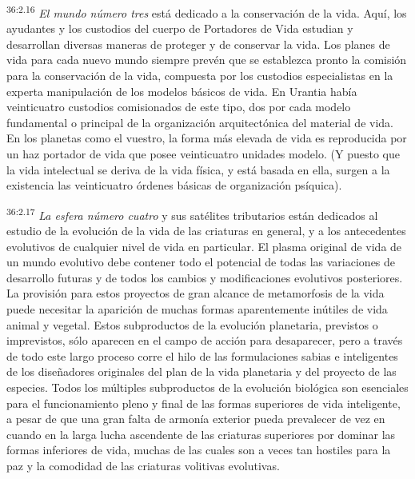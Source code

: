 \par
\textsuperscript{36:2.16} \textit{El mundo número tres} está dedicado a la conservación de la vida. Aquí, los ayudantes y los custodios del cuerpo de Portadores de Vida estudian y desarrollan diversas maneras de proteger y de conservar la vida. Los planes de vida para cada nuevo mundo siempre prevén que se establezca pronto la comisión para la conservación de la vida, compuesta por los custodios especialistas en la experta manipulación de los modelos básicos de vida. En Urantia había veinticuatro custodios comisionados de este tipo, dos por cada modelo fundamental o principal de la organización arquitectónica del material de vida. En los planetas como el vuestro, la forma más elevada de vida es reproducida por un haz portador de vida que posee veinticuatro unidades modelo. (Y puesto que la vida intelectual se deriva de la vida física, y está basada en ella, surgen a la existencia las veinticuatro órdenes básicas de organización psíquica).

\par
\textsuperscript{36:2.17} \textit{La esfera número cuatro} y sus satélites tributarios están dedicados al estudio de la evolución de la vida de las criaturas en general, y a los antecedentes evolutivos de cualquier nivel de vida en particular. El plasma original de vida de un mundo evolutivo debe contener todo el potencial de todas las variaciones de desarrollo futuras y de todos los cambios y modificaciones evolutivos posteriores. La provisión para estos proyectos de gran alcance de metamorfosis de la vida puede necesitar la aparición de muchas formas aparentemente inútiles de vida animal y vegetal. Estos subproductos de la evolución planetaria, previstos o imprevistos, sólo aparecen en el campo de acción para desaparecer, pero a través de todo este largo proceso corre el hilo de las formulaciones sabias e inteligentes de los diseñadores originales del plan de la vida planetaria y del proyecto de las especies. Todos los múltiples subproductos de la evolución biológica son esenciales para el funcionamiento pleno y final de las formas superiores de vida inteligente, a pesar de que una gran falta de armonía exterior pueda prevalecer de vez en cuando en la larga lucha ascendente de las criaturas superiores por dominar las formas inferiores de vida, muchas de las cuales son a veces tan hostiles para la paz y la comodidad de las criaturas volitivas evolutivas.

